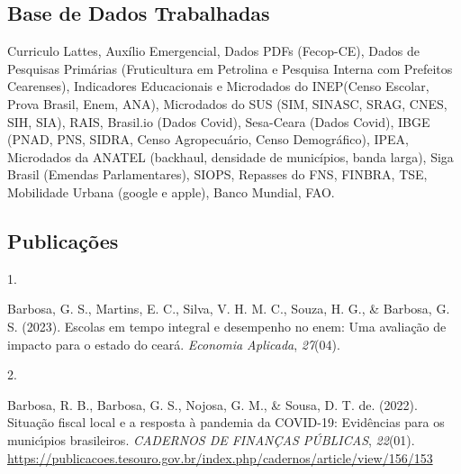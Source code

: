 \documentclass[11pt,a4paper,]{awesome-cv}
\newlength{\csllabelwidth}
\newcommand{\CSLLeftMargin}[1]{\parbox[t]{\csllabelwidth}{#1}}
\newcommand{\CSLRightInline}[1]{\parbox[t]{\linewidth - \csllabelwidth}{#1}}
\begin{document}
\hypertarget{base-de-dados-trabalhadas}{%
\subsection{\texorpdfstring{\textbf{Base de Dados
Trabalhadas}}{Base de Dados Trabalhadas}}\label{base-de-dados-trabalhadas}}

Curriculo Lattes, Auxílio Emergencial, Dados PDFs (Fecop-CE), Dados de
Pesquisas Primárias (Fruticultura em Petrolina e Pesquisa Interna com
Prefeitos Cearenses), Indicadores Educacionais e Microdados do
INEP(Censo Escolar, Prova Brasil, Enem, ANA), Microdados do SUS (SIM,
SINASC, SRAG, CNES, SIH, SIA), RAIS, Brasil.io (Dados Covid), Sesa-Ceara
(Dados Covid), IBGE (PNAD, PNS, SIDRA, Censo Agropecuário, Censo
Demográfico), IPEA, Microdados da ANATEL (backhaul, densidade de
municípios, banda larga), Siga Brasil (Emendas Parlamentares), SIOPS,
Repasses do FNS, FINBRA, TSE, Mobilidade Urbana (google e apple), Banco
Mundial, FAO.

\hypertarget{publicauxe7uxf5es}{%
\subsection{\texorpdfstring{\textbf{Publicações}}{Publicações}}\label{publicauxe7uxf5es}}

\hypertarget{bibliography}{}
\leavevmode{}%
\CSLLeftMargin{1. }%
\CSLRightInline{Barbosa, G. S., Martins, E. C., Silva, V. H. M. C.,
Souza, H. G., \& Barbosa, G. S. (2023). Escolas em tempo integral e
desempenho no enem: Uma avaliação de impacto para o estado do ceará.
\emph{Economia Aplicada}, \emph{27}(04).}

\leavevmode{}%
\CSLLeftMargin{2. }%
\CSLRightInline{Barbosa, R. B., Barbosa, G. S., Nojosa, G. M., \& Sousa,
D. T. de. (2022). Situação fiscal local e a resposta à pandemia da
COVID-19: Evidências para os municı́pios brasileiros. \emph{CADERNOS DE
FINANÇAS PÚBLICAS}, \emph{22}(01).
\url{https://publicacoes.tesouro.gov.br/index.php/cadernos/article/view/156/153}}


\label{LastPage}~
\end{document}
